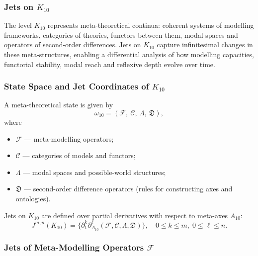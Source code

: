
\subsubsection{Jets on $K_{10}$}
\label{sec:jets-k10}

The level $K_{10}$ represents meta-theoretical continua: coherent systems
of modelling frameworks, categories of theories, functors between them,
modal spaces and operators of second-order differences. Jets on $K_{10}$
capture infinitesimal changes in these meta-structures, enabling a
differential analysis of how modelling capacities, functorial stability,
modal reach and reflexive depth evolve over time.


\subsubsection{State Space and Jet Coordinates of $K_{10}$}

A meta-theoretical state is given by
\[
\omega_{10}
=
(\mathcal{F},\ \mathcal{C},\ \Lambda,\ \mathfrak{D}),
\]
where
\begin{itemize}
    \item $\mathcal{F}$ — meta-modelling operators;
    \item $\mathcal{C}$ — categories of models and functors;
    \item $\Lambda$ — modal spaces and possible-world structures;
    \item $\mathfrak{D}$ — second-order difference operators
          (rules for constructing axes and ontologies).
\end{itemize}

Jets on $K_{10}$ are defined over partial derivatives with respect to
meta-axes $A_{10}$:
\[
J^{m,n}(K_{10}) =
\{\partial_t^k \partial_{A_{10}}^\ell
(\mathcal{F},\mathcal{C},\Lambda,\mathfrak{D})
\},
\quad
0\le k\le m,\;
0\le\ell\le n.
\]


\subsubsection{Jets of Meta-Modelling Operators $\mathcal{F}$}

